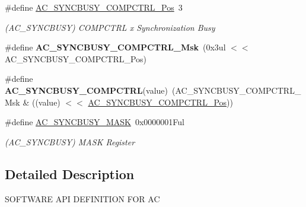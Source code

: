 \begin{DoxyCompactItemize}
\item 
\hypertarget{group___s_a_m_l21___a_c_gabc5074f82b91baf62ff2b8ab4a6ab5f1}{}\#define \hyperlink{group___s_a_m_l21___a_c_gabc5074f82b91baf62ff2b8ab4a6ab5f1}{A\+C\+\_\+\+S\+Y\+N\+C\+B\+U\+S\+Y\+\_\+\+C\+O\+M\+P\+C\+T\+R\+L\+\_\+\+Pos}~3\label{group___s_a_m_l21___a_c_gabc5074f82b91baf62ff2b8ab4a6ab5f1}

\begin{DoxyCompactList}\small\item\em (A\+C\+\_\+\+S\+Y\+N\+C\+B\+U\+S\+Y) C\+O\+M\+P\+C\+T\+R\+L x Synchronization Busy \end{DoxyCompactList}\item 
\hypertarget{group___s_a_m_l21___a_c_ga2bc6e6a28ea42a781116c648e5247843}{}\#define {\bfseries A\+C\+\_\+\+S\+Y\+N\+C\+B\+U\+S\+Y\+\_\+\+C\+O\+M\+P\+C\+T\+R\+L\+\_\+\+Msk}~(0x3ul $<$$<$ A\+C\+\_\+\+S\+Y\+N\+C\+B\+U\+S\+Y\+\_\+\+C\+O\+M\+P\+C\+T\+R\+L\+\_\+\+Pos)\label{group___s_a_m_l21___a_c_ga2bc6e6a28ea42a781116c648e5247843}

\item 
\hypertarget{group___s_a_m_l21___a_c_ga4de896b2322369d1656bab3e607ab45c}{}\#define {\bfseries A\+C\+\_\+\+S\+Y\+N\+C\+B\+U\+S\+Y\+\_\+\+C\+O\+M\+P\+C\+T\+R\+L}(value)~(A\+C\+\_\+\+S\+Y\+N\+C\+B\+U\+S\+Y\+\_\+\+C\+O\+M\+P\+C\+T\+R\+L\+\_\+\+Msk \& ((value) $<$$<$ \hyperlink{group___s_a_m_l21___a_c_gabc5074f82b91baf62ff2b8ab4a6ab5f1}{A\+C\+\_\+\+S\+Y\+N\+C\+B\+U\+S\+Y\+\_\+\+C\+O\+M\+P\+C\+T\+R\+L\+\_\+\+Pos}))\label{group___s_a_m_l21___a_c_ga4de896b2322369d1656bab3e607ab45c}

\item 
\hypertarget{group___s_a_m_l21___a_c_ga70886b642d59dc0d984049d60ba72fbf}{}\#define \hyperlink{group___s_a_m_l21___a_c_ga70886b642d59dc0d984049d60ba72fbf}{A\+C\+\_\+\+S\+Y\+N\+C\+B\+U\+S\+Y\+\_\+\+M\+A\+S\+K}~0x0000001\+Ful\label{group___s_a_m_l21___a_c_ga70886b642d59dc0d984049d60ba72fbf}

\begin{DoxyCompactList}\small\item\em (A\+C\+\_\+\+S\+Y\+N\+C\+B\+U\+S\+Y) M\+A\+S\+K Register \end{DoxyCompactList}\end{DoxyCompactItemize}


\subsection{Detailed Description}
S\+O\+F\+T\+W\+A\+R\+E A\+P\+I D\+E\+F\+I\+N\+I\+T\+I\+O\+N F\+O\+R A\+C 